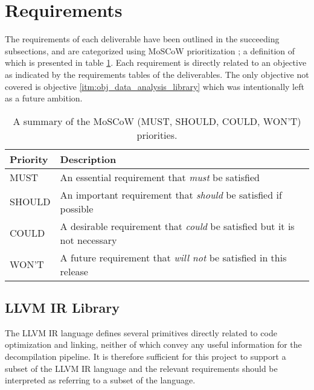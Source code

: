 
\section{Requirements}

The requirements of each deliverable have been outlined in the succeeding subsections, and are categorized using MoSCoW prioritization \cite{MoSCoW_analysis}; a definition of which is presented in table \ref{tbl:MoSCoW_priorities}. Each requirement is directly related to an objective as indicated by the requirements tables of the deliverables. The only objective not covered is objective \ref{itm:obj_data_analysis_library} which was intentionally left as a future ambition.

\begin{table}[htbp]
	\begin{center}
		\begin{tabular}{|l|l|}
			\hline
			Priority & Description \\
			\hline
			MUST & An essential requirement that \textit{must} be satisfied \\
			SHOULD & An important requirement that \textit{should} be satisfied if possible \\
			COULD & A desirable requirement that \textit{could} be satisfied but it is not necessary \\
			WON'T & A future requirement that \textit{will not} be satisfied in this release \\
			\hline
		\end{tabular}
	\end{center}
	\caption{A summary of the MoSCoW (MUST, SHOULD, COULD, WON'T) priorities.}
	\label{tbl:MoSCoW_priorities}
\end{table}


\subsection{LLVM IR Library}

The LLVM IR language defines several primitives directly related to code optimization and linking, neither of which convey any useful information for the decompilation pipeline. It is therefore sufficient for this project to support a subset of the LLVM IR language and the relevant requirements should be interpreted as referring to a subset of the language.

